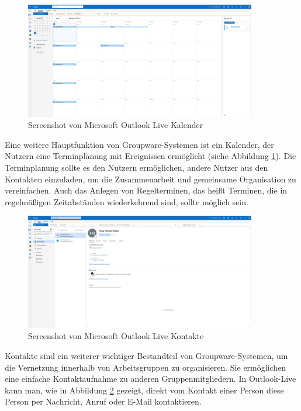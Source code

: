 \begin{figure}[H]
    \centering
    \includegraphics[width=0.9\textwidth]{images/OutlookLive_Calender1.png}
    \caption{Screenshot von Microsoft Outlook Live Kalender}
    \date{29.01.2024}
    \label{fig:outlook-live-calender}
\end{figure}

Eine weitere Hauptfunktion von Groupware-Systemen ist ein Kalender, der Nutzern eine Terminplanung mit Ereignissen ermöglicht (siehe Abbildung \ref{fig:outlook-live-calender}).
Die Terminplanung sollte es den Nutzern ermöglichen, andere Nutzer aus den Kontakten einzuladen, um die Zusammenarbeit und gemeinsame Organisation zu vereinfachen.
Auch das Anlegen von Regelterminen, das heißt Terminen, die in regelmäßigen Zeitabständen wiederkehrend sind, sollte möglich sein.

\begin{figure}[H]
    \centering
    \includegraphics[width=0.9\textwidth]{images/OutlookLive_Contacts.png}
    \caption{Screenshot von Microsoft Outlook Live Kontakte}
    \label{fig:outlook-live-contacts}
\end{figure}

Kontakte sind ein weiterer wichtiger Bestandteil von Groupware-Systemen, um die Vernetzung innerhalb von Arbeitsgruppen zu organisieren.
Sie ermöglichen eine einfache Kontaktaufnahme zu anderen Gruppenmitgliedern.
In Outlook-Live kann man, wie in Abbildung \ref{fig:outlook-live-contacts} gezeigt, direkt vom Kontakt einer Person diese Person per Nachricht, Anruf oder E-Mail kontaktieren.


